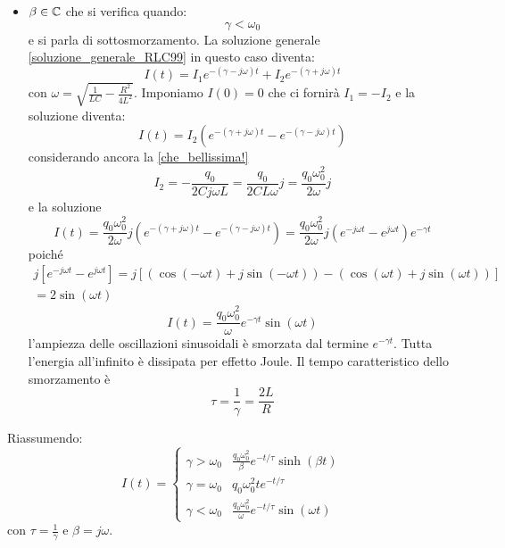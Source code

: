 \begin{itemize}
\begin{equation}
  \end{equation}
  \item{$\beta\in\mathbb{C}$} che si verifica quando:
  \begin{equation}
    \gamma<\omega_0
  \end{equation}
  e si parla di sottosmorzamento. La soluzione generale \eqref{soluzione_generale_RLC99} in questo caso diventa:
  \begin{equation}
    I(t)=I_1e^{-(\gamma-j \omega)t}+I_2e^{-(\gamma+j \omega)t}
  \end{equation}
  con $\omega=\sqrt{\frac{1}{LC}-\frac{R^2}{4L^2}}$. Imponiamo $I(0)=0$ che ci fornirà $I_1=-I_2$ e la soluzione diventa:
  \begin{equation}
    I(t)=I_2\left(e^{-(\gamma+j\omega)t}-e^{-(\gamma-j\omega)t}\right)
  \end{equation}
  considerando ancora la \eqref{che_bellissima!}
  \begin{equation}
    I_2=-\frac{q_0}{2Cj\omega L}=\frac{q_0}{2CL\omega}j=\frac{q_0\omega_0^2}{2\omega}j
  \end{equation}
  e la soluzione
  \begin{equation}
    I(t)=\frac{q_0\omega_0^2}{2\omega}j\left(e^{-(\gamma+j\omega)t}-e^{-(\gamma-j\omega)t}\right)=\frac{q_0\omega_0^2}{2\omega}j\left(e^{-j\omega t}-e^{j\omega t}\right)e^{-\gamma t}
  \end{equation}
  poiché
  \begin{multline}
    j\left[e^{-j\omega t}-e^{j\omega t}\right]=j\left[\left(\cos(-\omega t)+j\sin(-\omega
      t)\right)-\left(\cos(\omega t)+j\sin(\omega t)\right)\right]\\
    =2\sin(\omega t)
  \end{multline}
  \begin{equation}
    I(t)=\frac{q_0\omega_0^2}{\omega}e^{-\gamma t}\sin(\omega t)
  \end{equation}
  l'ampiezza delle oscillazioni sinusoidali è smorzata dal termine $e^{-\gamma t}$. Tutta l'energia all'infinito è dissipata per effetto Joule. Il tempo caratteristico dello smorzamento è
  \begin{equation}
    \tau=\frac{1}{\gamma}=\frac{2L}{R}
  \end{equation}
\end{itemize}
Riassumendo:
\begin{equation}
  I(t) =
  \begin{cases}
    \gamma > \omega_0 & \frac{q_0\omega_0^2}{\beta}e^{-t/\tau}\sinh(\beta t)  \\
    \gamma = \omega_0 & q_0\omega_0^2te^{-t/\tau}                             \\
    \gamma < \omega_0 & \frac{q_0\omega_0^2}{\omega}e^{-t/\tau}\sin(\omega t)
  \end{cases}
\end{equation}
con $\tau = \frac{1}{\gamma}$ e $\beta=j\omega$.
